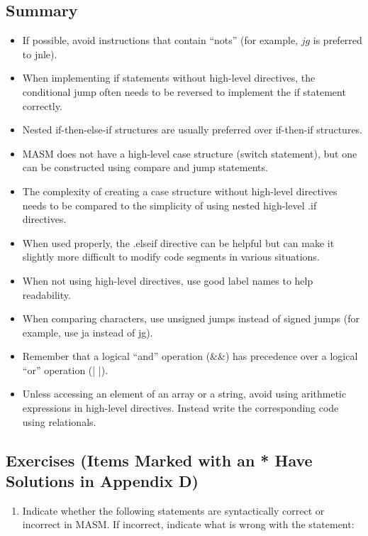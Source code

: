 \documentclass[10pt]{book}
\begin{document}
\subsection{Summary}
\begin{itemize}
  \item If possible, avoid instructions that contain ``nots'' (for example, $j g$ is preferred to jnle).
  \item When implementing if statements without high-level directives, the conditional jump often needs to be reversed to implement the if statement correctly.
  \item Nested if-then-else-if structures are usually preferred over if-then-if structures.
  \item MASM does not have a high-level case structure (switch statement), but one can be constructed using compare and jump statements.
  \item The complexity of creating a case structure without high-level directives needs to be compared to the simplicity of using nested high-level .if directives.
  \item When used properly, the .elseif directive can be helpful but can make it slightly more difficult to modify code segments in various situations.
  \item When not using high-level directives, use good label names to help readability.
  \item When comparing characters, use unsigned jumps instead of signed jumps (for example, use ja instead of jg).
  \item Remember that a logical ``and'' operation (\&\&) has precedence over a logical ``or'' operation (| |).
  \item Unless accessing an element of an array or a string, avoid using arithmetic expressions in high-level directives. Instead write the corresponding code using relationals.
\end{itemize}
\subsection{Exercises (Items Marked with an * Have Solutions in Appendix D)}
\begin{enumerate}
  \item Indicate whether the following statements are syntactically correct or incorrect in MASM. If incorrect, indicate what is wrong with the statement:
\end{enumerate}
\end{document}
